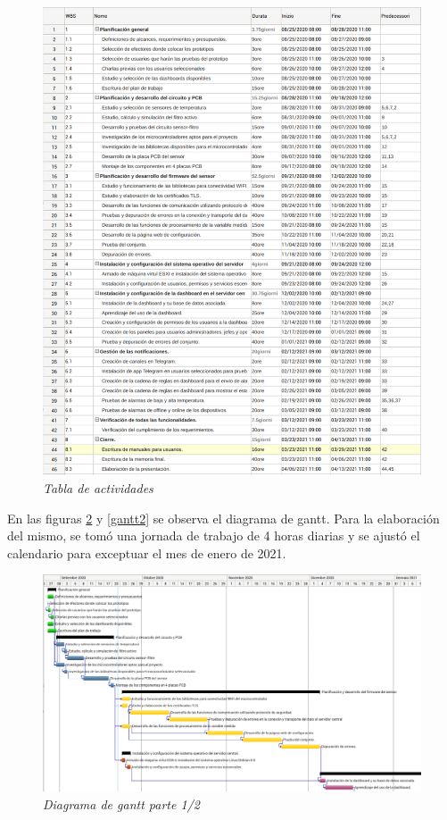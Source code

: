 \documentclass[11pt]{charter}
\begin{document}
\begin{figure}[htpb]
\centering 
\includegraphics[width=1\textwidth]{./Figuras/wbs.pdf}
\caption{\textit{Tabla de actividades}}
\label{wbs}
\end{figure}




En las figuras \ref{gantt1} y \ref{gantt2} se observa el diagrama de gantt.
Para la elaboración del mismo, se tomó una jornada de trabajo de 4 horas diarias y se ajustó el calendario para exceptuar el mes de enero de 2021.


\begin{figure}[htpb]
\centering 
\includegraphics[angle=-90,width=.75\textwidth]{./Figuras/gantt1.png}
\vspace{-0.3cm} 
\caption{\textit{Diagrama de gantt parte 1/2}}
\label{gantt1}
\end{figure}
\end{document}
